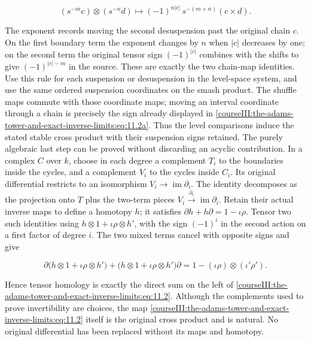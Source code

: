 \begin{equation}
(s^{-m}c)\otimes(s^{-n}d)
  \longmapsto(-1)^{n|c|}\,
     s^{-(m+n)}(c\times d).
 \label{courseIII:the-adams-tower-and-exact-inverse-limits:eq:11.2a}
\end{equation}

The exponent records moving the second desuspension past the original chain \(c\). On the first boundary term the exponent changes by \(n\) when \(|c|\) decreases by one; on the second term the original tensor sign \((-1)^{|c|}\) combines with the shifts to give \((-1)^{|c|-m}\) in the source. These are exactly the two chain-map identities. Use this rule for each suspension or desuspension in the level-space system, and use the same ordered suspension coordinates on the smash product. The shuffle maps commute with those coordinate maps; moving an interval coordinate through a chain is precisely the sign already displayed in \eqref{courseIII:the-adams-tower-and-exact-inverse-limits:eq:11.2a}. Thus the level comparisons induce the stated stable cross product with their suspension signs retained.
The purely algebraic last step can be proved without discarding an acyclic contribution. In a complex \(C\) over \(k\), choose in each degree a complement \(T_i\) to the boundaries inside the cycles, and a complement \(V_i\) to the cycles inside \(C_i\). Its original differential restricts to an isomorphism \(V_i\to\operatorname{im}\partial_i\). The identity decomposes as the projection onto \(T\) plus the two-term pieces \(V_i\xrightarrow{\partial_i}\operatorname{im}\partial_i\). Retain their actual inverse maps to define a homotopy \(h\); it satisfies
\(\partial h+h\partial=1-\iota\rho\).
Tensor two such identities using
\(h\otimes1+\iota\rho\otimes h'\), with the sign \((-1)^i\) in the second action on a first factor of degree \(i\). The two mixed terms cancel with opposite signs and give

\begin{equation}
\partial\bigl(h\otimes1+\iota\rho\otimes h'\bigr)
 +\bigl(h\otimes1+\iota\rho\otimes h'\bigr)\partial
   =1-(\iota\rho)\otimes(\iota'\rho').
 \label{courseIII:the-adams-tower-and-exact-inverse-limits:eq:11.3}
\end{equation}

Hence tensor homology is exactly the direct sum on the left of \eqref{courseIII:the-adams-tower-and-exact-inverse-limits:eq:11.2}. Although the complements used to prove invertibility are choices, the map \eqref{courseIII:the-adams-tower-and-exact-inverse-limits:eq:11.2} itself is the original cross product and is natural. No original differential has been replaced without its maps and homotopy.

